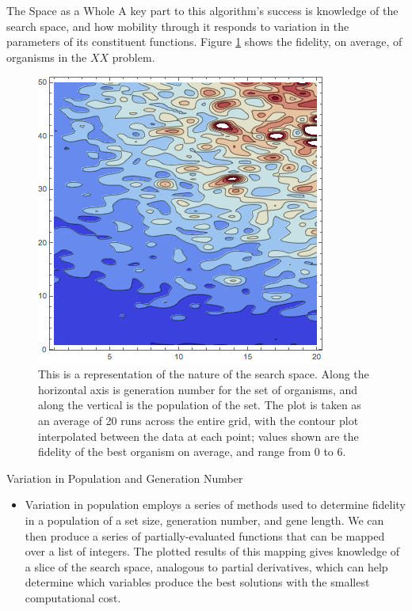 \documentclass[12pt]{beamer}
\renewcommand{\maketitle}{%
	\begin{center}%
		\Huge\inserttitle\\[5mm]%
		\Large\insertauthor\\[5mm]%
		\Large\insertinstitute%
	\end{center}%
	\vspace*{-1.5ex}%
}
\begin{document}
\begin{frame}{\maketitle}
\begin{columns}
\begin{column}{.45\textwidth}
\begin{block}{The Space as a Whole}
  A key part to this algorithm's success is knowledge of the search space, and how mobility through it responds to variation in the parameters of its constituent functions. Figure \ref{fig:tot_plot} shows the fidelity, on average, of organisms in the $XX$ problem.

	\begin{figure}[htpb]
		\centering
			\includegraphics[scale=1.05]{genPlot_50O_20G.png}
		\centering
		\caption{This is a representation of the nature of the search space. Along the horizontal axis is generation number for the set of organisms, and along the vertical is the population of the set. The plot is taken as an average of 20 runs across the entire grid, with the contour plot interpolated between the data at each point; values shown are the fidelity of the best organism on average, and range from 0 to 6.}
		\label{fig:tot_plot}
	\end{figure}
\end{block}
\vspace{1em}
\begin{exampleblock}{Variation in Population and Generation Number}

	\begin{itemize}
	\item Variation in population employs a series of methods used to determine fidelity in a population of a set size, generation number, and gene length. We can then produce a series of partially-evaluated functions that can be mapped over a list of integers. The plotted results of this mapping gives knowledge of a slice of the search space, analogous to partial derivatives, which can help determine which variables produce the best solutions with the smallest computational cost. 
	

\end{itemize}
\end{exampleblock}
\end{column}
\end{columns}
\end{frame}
\end{document}
